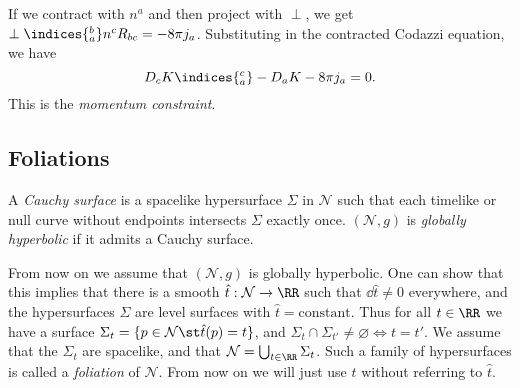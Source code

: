 \documentclass{jknotes}
\begin{document}
If we contract with \(n^a\) and then project with \(\perp\), we get \(\perp\indices{^b_a}n^cR_{bc} = -8\pi j_a\). Substituting in the contracted Codazzi equation, we have
\begin{equation}
    D_cK\indices{^c_a}-D_aK-8\pi j_a = 0.
\end{equation}
This is the \emph{momentum constraint}.

\subsection{Foliations}
\begin{defn}
    A \emph{Cauchy surface} is a spacelike hypersurface \(\Sigma\) in \(\mathcal{N}\) such that each timelike or null curve without endpoints intersects \(\Sigma\) exactly once. \((\mathcal{N},g)\) is \emph{globally hyperbolic} if it admits a Cauchy surface.
\end{defn}
From now on we assume that \((\mathcal{N},g)\) is globally hyperbolic. One can show that this implies that there is a smooth \(\hat{t}:\mathcal{N}\to\RR\) such that \(\dd{\hat{t}}\ne0\) everywhere, and the hypersurfaces \(\Sigma\) are level surfaces with \(\hat{t}=\text{constant}\). Thus for all \(t \in \RR\) we have a surface \(\Sigma_t = \{p\in\mathcal{N}\st \hat{t}(p) = t\}\), and \(\Sigma_t\cap\Sigma_{t'}\ne \varnothing \iff t=t'\). We assume that the \(\Sigma_t\) are spacelike, and that \(\mathcal{N}=\bigcup_{t\in\RR}\Sigma_t\). Such a family of hypersurfaces is called a \emph{foliation} of \(\mathcal{N}\). From now on we will just use \(t\) without referring to \(\hat{t}\).
\end{document}
